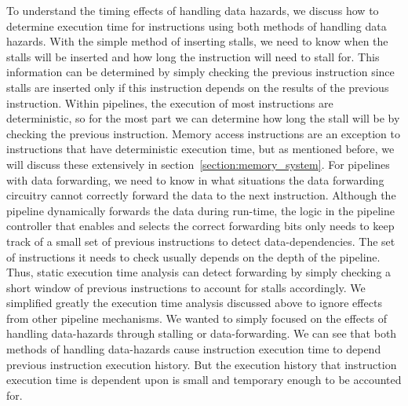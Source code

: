 To understand the timing effects of handling data hazards, we discuss how to determine execution time for instructions using both methods of handling data hazards.  
With the simple method of inserting stalls, we need to know when the stalls will be inserted and how long the instruction will need to stall for.
This information can be determined by simply checking the previous instruction since stalls are inserted only if this instruction depends on the results of the previous instruction.
Within pipelines, the execution of most instructions are deterministic, so for the most part we can determine how long the stall will be by
checking the previous instruction.
Memory access instructions are an exception to instructions that have deterministic execution time, but as mentioned before, we will discuss these extensively in section~\ref{section:memory_system}.
For pipelines with data forwarding, we need to know in what situations the data forwarding circuitry cannot correctly forward the data to the next instruction.    
Although the pipeline dynamically forwards the data during run-time, the logic in the pipeline controller that enables and selects the correct forwarding bits only needs to keep track of a small set of previous instructions to detect data-dependencies.
The set of instructions it needs to check usually depends on the depth of the pipeline.  
Thus, static execution time analysis can detect forwarding by simply checking a short window of previous instructions to account for stalls accordingly. 
We simplified greatly the execution time analysis discussed above to ignore effects from other pipeline mechanisms.
We wanted to simply focused on the effects of handling data-hazards through stalling or data-forwarding.  
We can see that both methods of handling data-hazards cause instruction execution time to depend previous instruction execution history. 
But the execution history that instruction execution time is dependent upon is small and temporary enough to be accounted for.
  

